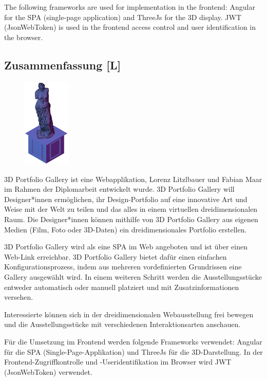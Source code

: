 The following frameworks are used for implementation in the frontend: Angular for the SPA (single-page application) and ThreeJs for the 3D display. JWT (JsonWebToken) is used in the frontend access control and user identification in the browser.
\newpage
\begin{spacing}{1}
    \chapter*{Zusammenfassung [L]}
\end{spacing}
\begin{figure}
    \begin{center}
      \includegraphics[width=0.2\textwidth]{pics/statue.png}
    \end{center}
\end{figure}
3D Portfolio Gallery ist eine Webapplikation, Lorenz Litzlbauer und Fabian Maar im Rahmen der Diplomarbeit entwickelt wurde. 3D Portfolio Gallery will Designer*innen ermöglichen, ihr Design-Portfolio auf eine innovative Art und Weise mit der Welt zu teilen und das alles in einem virtuellen dreidimensionalen Raum. Die Designer*innen können mithilfe von 3D Portfolio Gallery aus eigenen Medien (Film, Foto oder 3D-Daten) ein dreidimensionales Portfolio erstellen.

3D Portfolio Gallery wird als eine SPA im Web angeboten und ist über einen Web-Link erreichbar. 3D Portfolio Gallery bietet dafür einen einfachen Konfigurationsprozess, indem aus mehreren vordefinierten Grundrissen eine Gallery ausgewählt wird. In einem weiteren Schritt werden die Ausstellungsstücke entweder automatisch oder manuell platziert und mit Zusatzinformationen versehen.

Interessierte können sich in der dreidimensionalen Webausstellung frei bewegen und die
Ausstellungsstücke mit verschiedenen Interaktionsarten anschauen.

Für die Umsetzung im Frontend werden folgende Frameworks verwendet: Angular für die SPA (Single-Page-Applikation) und ThreeJs für die 3D-Darstellung. In der Frontend-Zugriffkontrolle und -Useridentifikation im Browser wird JWT (JsonWebToken) verwendet.